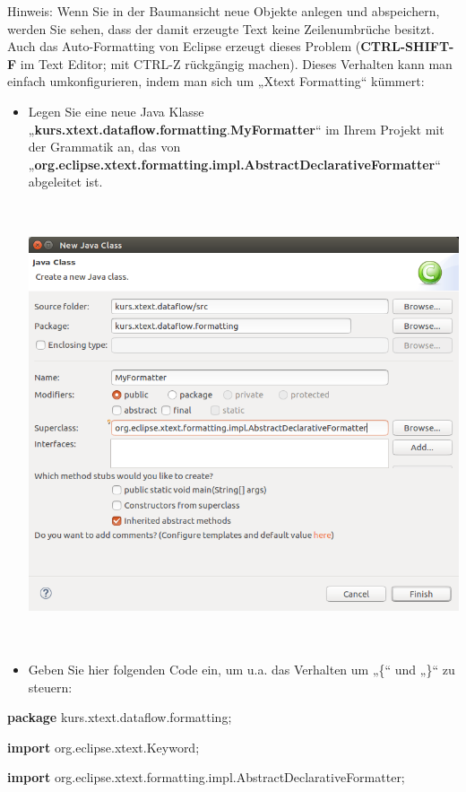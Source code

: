 \documentclass[]{article}
\begin{document}
Hinweis: Wenn Sie in der Baumansicht neue Objekte anlegen und
abspeichern, werden Sie sehen, dass der damit erzeugte Text keine
Zeilenumbrüche besitzt. Auch das Auto-Formatting von Eclipse erzeugt
dieses Problem (\textbf{CTRL-SHIFT-F} im Text Editor; mit CTRL-Z
rückgängig machen). Dieses Verhalten kann man einfach umkonfigurieren,
indem man sich um „Xtext Formatting`` kümmert:

\begin{itemize}
\item
  Legen Sie eine neue Java Klasse
  „\textbf{kurs.xtext.dataflow.formatting}.\textbf{MyFormatter}`` im
  Ihrem Projekt mit der Grammatik an, das von
  „\textbf{org.eclipse.xtext.formatting.impl.AbstractDeclarativeFormatter}``
  abgeleitet ist.

  \includegraphics[width=5.89650in,height=5.12010in]{./Pictures/10000201000002F00000028DA25B000046F4964A.png}
\item
  Geben Sie hier folgenden Code ein, um u.a. das Verhalten um „\{`` und
  „\}`` zu steuern:
\end{itemize}

\textbf{package} kurs.xtext.dataflow.formatting;

\textbf{import} org.eclipse.xtext.Keyword;

\textbf{import}
org.eclipse.xtext.formatting.impl.AbstractDeclarativeFormatter;
\end{document}
